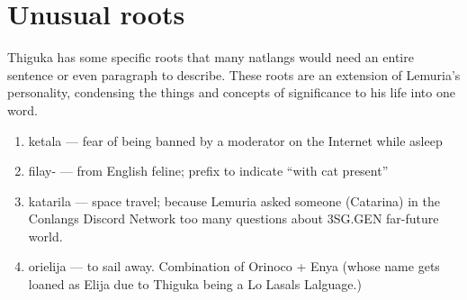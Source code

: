 \section{Unusual roots}
Thiguka has some specific roots that many natlangs would need an entire sentence or even paragraph to describe.
These roots are an extension of Lemuria's personality, condensing the things and concepts of significance to his life into one word.

\begin{enumerate}
    \item ketala --- fear of being banned by a moderator on the Internet while asleep
    \item filay- --- from English feline; prefix to indicate ``with cat present''
    \item katarila --- space travel; because Lemuria asked someone (Catarina) in the Conlangs Discord Network too many questions about 3SG.GEN far-future world.
    \item orielija --- to sail away. Combination of Orinoco + Enya (whose name gets loaned as Elija due to Thiguka being a Lo Lasals Lalguage.)
\end{enumerate}